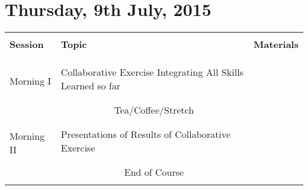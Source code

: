 \documentclass{article}[12pt]
\begin{document}
\section*{Thursday, 9th July, 2015}
\begin{table}[h!]
\begin{tabular}{ |p{2cm}|p{5cm}|p{6cm}| }
\hline
                               &                              & \\
\textbf{Session}               & \textbf{Topic}               & \textbf{Materials} \\ 
                               &                              & \\ \hline \hline
 & & \\



 & & \\
\multirow{2}{*}{Morning I }    & Collaborative Exercise Integrating All Skills Learned so far &  \\
                              &               & \\ \hline 
\multicolumn{3}{c}{} \\ 
\multicolumn{3}{c}{Tea/Coffee/Stretch}  \\ 
\multicolumn{3}{c}{} \\ \hline
 & & \\
\multirow{2}{*}{Morning II}      & Presentations of Results of Collaborative Exercise      & \\
 & & \\ \hline
\multicolumn{3}{c}{} \\
\multicolumn{3}{c}{End of Course}  \\ 
\multicolumn{3}{c}{} \\
\end{tabular}
\end{table}
\end{document}
